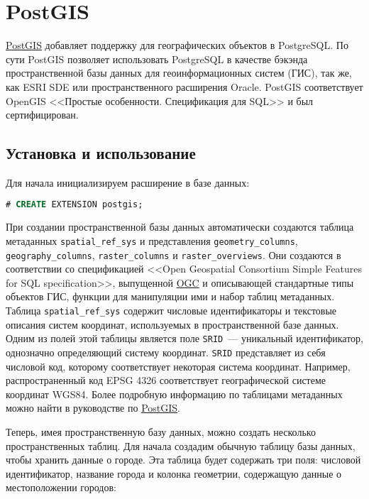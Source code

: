 \section{PostGIS}

\href{http://www.postgis.org/}{PostGIS} добавляет поддержку для географических объектов в PostgreSQL. По сути PostGIS позволяет использовать PostgreSQL в качестве бэкэнда пространственной базы данных для геоинформационных систем (ГИС), так же, как ESRI SDE или пространственного расширения Oracle. PostGIS соответствует OpenGIS <<Простые особенности. Спецификация для SQL>> и был сертифицирован.

\subsection{Установка и использование}

Для начала инициализируем расширение в базе данных:

\begin{lstlisting}[language=SQL,label=lst:postgisinit,caption=Инициализация postgis]
# CREATE EXTENSION postgis;
\end{lstlisting}

При создании пространственной базы данных автоматически создаются таблица метаданных \lstinline!spatial_ref_sys! и представления \lstinline!geometry_columns!, \lstinline!geography_columns!, \lstinline!raster_columns! и \lstinline!raster_overviews!. Они создаются в соответствии со спецификацией <<Open Geospatial Consortium Simple Features for SQL specification>>, выпущенной \href{http://www.opengeospatial.org/}{OGC} и описывающей стандартные типы объектов ГИС, функции для манипуляции ими и набор таблиц метаданных. Таблица \lstinline!spatial_ref_sys! содержит числовые идентификаторы и текстовые описания систем координат, используемых в пространственной базе данных. Одним из полей этой таблицы является поле \lstinline!SRID!~--- уникальный идентификатор, однозначно определяющий систему координат. \lstinline!SRID! представляет из себя числовой код, которому соответствует некоторая система координат. Например, распространенный код EPSG 4326 соответствует географической системе координат WGS84. Более подробную информацию по таблицами метаданных можно найти в руководстве по \href{http://postgis.net/docs/manual-2.3/using_postgis_dbmanagement.html#spatial_ref_sys}{PostGIS}.

Теперь, имея пространственную базу данных, можно создать несколько пространственных таблиц. Для начала создадим обычную таблицу базы данных, чтобы хранить данные о городе. Эта таблица будет содержать три поля: числовой идентификатор, название города и колонка геометрии, содержащую данные о местоположении городов:

